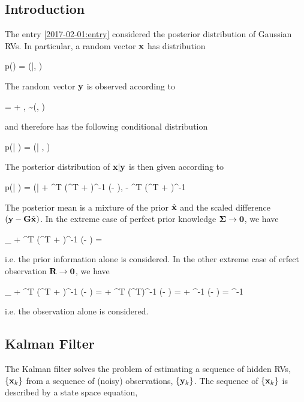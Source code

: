 
\subsection{Introduction}

The entry \ref{2017-02-01:entry} considered the posterior distribution of Gaussian RVs. In particular, a random vector $\mathbf{x}$ has distribution

\bee
p(\xbf) = \Nc(\xbf|\hat\xbf, \Sigmabf)
\eee

The random vector $\mathbf{y}$ is observed according to

\bee
\ybf = \Gbf \xbf + \vbf, \quad \vbf \sim \Nc(\zerobf, \Rbf)
\eee

and therefore has the following conditional distribution

\bee
p(\ybf | \xbf) = \Nc(\ybf | \Gbf \xbf, \Rbf)
\eee

The posterior distribution of $\mathbf{x} | \mathbf{y}$ is then given according to

\bee
p(\xbf | \ybf) = \Nc(\xbf | \hat\xbf + \Sigmabf \Gbf^T (\Gbf \Sigmabf \Gbf^T + \Rbf )^{-1} (\ybf - \Gbf \hat\xbf), \Sigmabf - \Sigmabf \Gbf^T (\Gbf \Sigmabf \Gbf^T + \Rbf)^{-1} \Gbf \Sigmabf
\eee

The posterior mean is a mixture of the prior $\hat{\mathbf{x}}$ and the scaled difference $(\mathbf{y} - \mathbf{G} \hat{\mathbf{x}})$. In the extreme case of perfect prior knowledge $\mathbf{\Sigma} \rightarrow \mathbf{0}$, we have

\bee
\lim_{\Sigmabf \rightarrow \zerobf} \hat\xbf + \Sigmabf \Gbf^T (\Gbf \Sigmabf \Gbf^T + \Rbf )^{-1} (\ybf - \Gbf \hat\xbf) = \hat\xbf
\eee

i.e. the prior information alone is considered. In the other extreme case of erfect observation $\mathbf{R} \rightarrow \mathbf{0}$, we have

\bee
\lim_{\Rbf \rightarrow \zerobf} \hat\xbf + \Sigmabf \Gbf^T (\Gbf \Sigmabf \Gbf^T + \Rbf )^{-1} (\ybf - \Gbf \hat\xbf) = \hat\xbf + \Sigmabf \Gbf^T (\Gbf \Sigmabf \Gbf^T)^{-1} (\ybf - \Gbf \hat\xbf) = \hat\xbf + \Gbf^{-1} (\ybf - \Gbf \hat\xbf) = \Gbf^{-1} \ybf
\eee

i.e. the observation alone is considered.


\subsection{Kalman Filter}

The Kalman filter solves the problem of estimating a sequence of hidden RVs, $\{ \mathbf{x}_k \}$ from a sequence of (noisy) observations, $\{ \mathbf{y}_k \}$. The sequence of $\{ \mathbf{x}_k \}$ is described by a state space equation,

